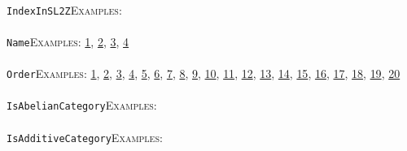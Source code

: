 \documentclass[a4paper,11pt]{report}
\begin{document}
{{ \\
 \texttt{IndexInSL2Z}{\nobreakspace}{\nobreakspace}{\nobreakspace}{\nobreakspace}\textsc{Examples:} \\
 \\
 \texttt{Name}{\nobreakspace}{\nobreakspace}{\nobreakspace}{\nobreakspace}\textsc{Examples:} \href{tutorial/chap6.html} {1}{\nobreakspace}, \href{../www/SideLinks/About/aboutAbelianCategories.html} {2}{\nobreakspace}, \href{../www/SideLinks/About/aboutGraphsOfGroups.html} {3}{\nobreakspace}, \href{../www/SideLinks/About/aboutIntro.html} {4}{\nobreakspace} \\
 \\
 \texttt{Order}{\nobreakspace}{\nobreakspace}{\nobreakspace}{\nobreakspace}\textsc{Examples:} \href{tutorial/chap3.html} {1}{\nobreakspace}, \href{tutorial/chap6.html} {2}{\nobreakspace}, \href{../www/SideLinks/About/aboutAbelianCategories.html} {3}{\nobreakspace}, \href{../www/SideLinks/About/aboutNonabelian.html} {4}{\nobreakspace}, \href{../www/SideLinks/About/aboutPeriodic.html} {5}{\nobreakspace}, \href{../www/SideLinks/About/aboutCohomologyRings.html} {6}{\nobreakspace}, \href{../www/SideLinks/About/aboutPoincareSeries.html} {7}{\nobreakspace}, \href{../www/SideLinks/About/aboutCoveringSpaces.html} {8}{\nobreakspace}, \href{../www/SideLinks/About/aboutCoverinSpaces.html} {9}{\nobreakspace}, \href{../www/SideLinks/About/aboutPolytopes.html} {10}{\nobreakspace}, \href{../www/SideLinks/About/aboutQuandles.html} {11}{\nobreakspace}, \href{../www/SideLinks/About/aboutCrossedMods.html} {12}{\nobreakspace}, \href{../www/SideLinks/About/aboutquasi.html} {13}{\nobreakspace}, \href{../www/SideLinks/About/aboutSchurMultiplier.html} {14}{\nobreakspace}, \href{../www/SideLinks/About/aboutSimplicialGroups.html} {15}{\nobreakspace}, \href{../www/SideLinks/About/aboutExtensions.html} {16}{\nobreakspace}, \href{../www/SideLinks/About/aboutSpaceGroup.html} {17}{\nobreakspace}, \href{../www/SideLinks/About/aboutSuperperfect.html} {18}{\nobreakspace}, \href{../www/SideLinks/About/aboutGouter.html} {19}{\nobreakspace}, \href{../www/SideLinks/About/aboutTensorSquare.html} {20}{\nobreakspace} \\
 \\
 \texttt{IsAbelianCategory}{\nobreakspace}{\nobreakspace}{\nobreakspace}{\nobreakspace}\textsc{Examples:} \\
 \\
 \texttt{IsAdditiveCategory}{\nobreakspace}{\nobreakspace}{\nobreakspace}{\nobreakspace}\textsc{Examples:} \\
}}
\end{document}
